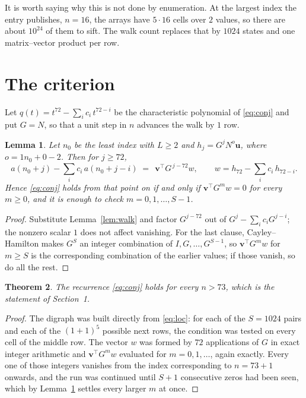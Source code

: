 \documentclass[11pt,a4paper]{article}
\theoremstyle{plain}
\newtheorem{theorem}{Theorem}
\newtheorem{lemma}[theorem]{Lemma}
\theoremstyle{definition}
\begin{document}
It is worth saying why this is not done by enumeration. At the largest index the entry
publishes, $n=16$, the arrays have $5\cdot16$ cells over
$2$ values, so there are about $10^{24}$ of them to sift. The
walk count replaces that by $1024$ states and one matrix--vector product per row.
\section{The criterion}

Let $q(t)=t^{72}-\sum_i c_i\,t^{72-i}$ be the characteristic polynomial of
\eqref{eq:conj} and put $G=N$, so that a unit step in $n$ advances the walk by
$1$ row.

\begin{lemma}\label{lem:crit}
Let $n_0$ be the least index with $L\ge2$ and $h_j=G^{j}N^{o}\mathbf{u}$, where
$o=1n_0+0-2$. Then for $j\ge72$,
\[
a(n_0+j)-\sum_i c_i\,a(n_0+j-i)\;=\;\,\mathbf{v}^{\!\top}G^{\,j-72}w,
\qquad w=h_{72}-\sum_i c_i\,h_{72-i} .
\]
Hence \eqref{eq:conj} holds from that point on if and only if
$\mathbf{v}^{\!\top}G^{m}w=0$ for every $m\ge0$, and it is enough to check
$m=0,1,\dots,S-1$.
\end{lemma}

\begin{proof}
Substitute Lemma~\ref{lem:walk} and factor $G^{j-72}$ out of
$G^{j}-\sum_ic_iG^{j-i}$; the nonzero scalar $1$ does not affect
vanishing. For the last clause, Cayley--Hamilton makes $G^{S}$ an integer combination of
$I,G,\dots,G^{S-1}$, so $\mathbf{v}^{\!\top}G^{m}w$ for $m\ge S$ is the corresponding
combination of the earlier values; if those vanish, so do all the rest.
\end{proof}

\begin{theorem}
The recurrence \eqref{eq:conj} holds for every $n>73$, which is the statement of
Section~1.
\end{theorem}

\begin{proof}
The digraph was built directly from \eqref{eq:loc}: for each of the $S=1024$ pairs and each
of the $(1+1)^{5}$ possible next rows, the condition was tested on every cell of
the middle row. The vector $w$ was formed by $72$ applications of $G$ in exact integer
arithmetic and $\mathbf{v}^{\!\top}G^{m}w$ evaluated for $m=0,1,\dots$, again exactly.
Every one of those integers vanishes from the index corresponding to $n=73+1$ onwards,
and the run was continued until $S+1$ consecutive zeros had been seen, which by
Lemma~\ref{lem:crit} settles every larger $m$ at once.
\end{proof}
\end{document}
